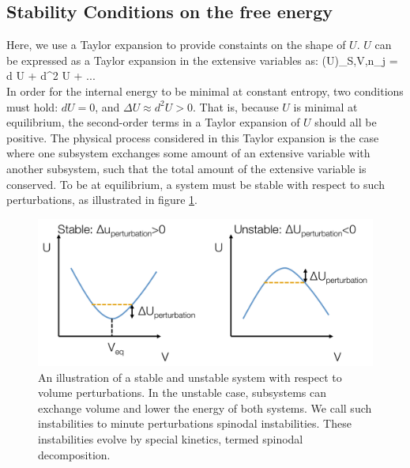 \documentclass[12pt]{article}
\begin{document}
\subsection{Stability Conditions on the free energy} 
Here, we use a Taylor expansion to provide constaints on the shape of $U$. $U$ can be expressed as a Taylor expansion in the extensive variables as:
\eqs
(\Delta U)_{S,V,n_j} = d U + d^2 U + ...\\
\eqe
In order for the internal energy to be minimal at constant entropy, two conditions must hold: $d U = 0$, and $\Delta U \approx d^2U > 0$. That is, because $U$ is minimal at equilibrium, the second-order terms in a Taylor expansion of $U$ should all be positive. The physical process considered in this Taylor expansion is the case where one subsystem exchanges some amount of an extensive variable with another subsystem, such that the total amount of the extensive variable is conserved. To be at equilibrium, a system must be stable with respect to such perturbations, as illustrated in figure \ref{stability}. 
\begin{figure}[h]
\centering
\includegraphics[width=\textwidth]{StabilityWRTPerturbations}
\caption{An illustration of a stable and unstable system with respect to volume perturbations. In the unstable case, subsystems can exchange volume and lower the energy of both systems. We call such instabilities to minute perturbations spinodal instabilities. These instabilities evolve by special kinetics, termed spinodal decomposition.}
\label{stability}
\end{figure}
\end{document}
